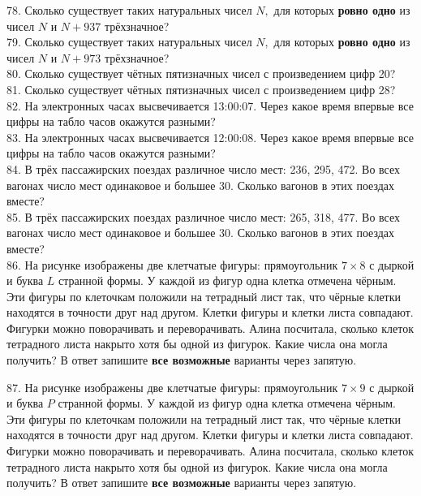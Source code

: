 78. Сколько существует таких натуральных чисел $N,$ для которых {\bf ровно одно} из чисел $N$ и $N+937$ трёхзначное?\\
79. Сколько существует таких натуральных чисел $N,$ для которых {\bf ровно одно} из чисел $N$ и $N+973$ трёхзначное?\\
80. Сколько существует чётных пятизначных чисел с произведением цифр 20?\\
81. Сколько существует чётных пятизначных чисел с произведением цифр 28?\\
82. На электронных часах высвечивается 13:00:07. Через какое время впервые все цифры на табло часов окажутся разными?\\
83. На электронных часах высвечивается 12:00:08. Через какое время впервые все цифры на табло часов окажутся разными?\\
84. В трёх пассажирских поездах различное число мест: 236, 295, 472. Во всех вагонах число мест одинаковое и большее 30. Сколько вагонов в этих поездах вместе?\\
85. В трёх пассажирских поездах различное число мест: 265, 318, 477. Во всех вагонах число мест одинаковое и большее 30. Сколько вагонов в этих поездах вместе?\\
86. На рисунке изображены две клетчатые фигуры: прямоугольник $7\times8$ с дыркой и буква $L$ странной формы. У каждой из фигур одна клетка отмечена чёрным. Эти фигуры по клеточкам положили на тетрадный лист так, что чёрные клетки находятся в точности друг над другом. Клетки фигуры и клетки листа совпадают. Фигурки можно поворачивать и переворачивать. Алина посчитала, сколько клеток тетрадного листа накрыто хотя бы одной из фигурок. Какие числа она могла получить? В ответ запишите {\bf все возможные} варианты через запятую.
\begin{center}
\begin{figure}[ht!]
\end{figure}
\end{center}
87. На рисунке изображены две клетчатые фигуры: прямоугольник $7\times9$ с дыркой и буква $P$ странной формы. У каждой из фигур одна клетка отмечена чёрным. Эти фигуры по клеточкам положили на тетрадный лист так, что чёрные клетки находятся в точности друг над другом. Клетки фигуры и клетки листа совпадают. Фигурки можно поворачивать и переворачивать. Алина посчитала, сколько клеток тетрадного листа накрыто хотя бы одной из фигурок. Какие числа она могла получить? В ответ запишите {\bf все возможные} варианты через запятую.
\begin{center}
\begin{figure}[ht!]
\end{figure}
\end{center}
